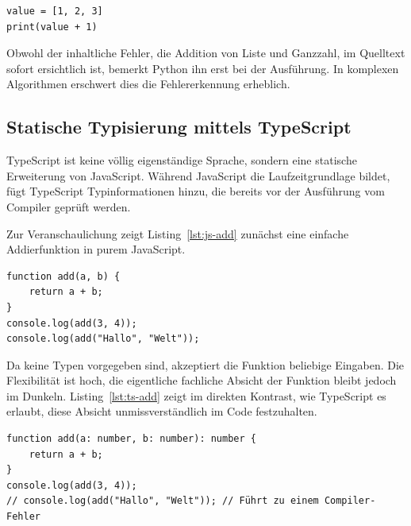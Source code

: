 \begin{listing}[htbp]
    \caption{Typfehler wird erst zur Laufzeit sichtbar}
    \label{lst:python-runtime-type-error}
    \begin{verbatim}
value = [1, 2, 3]
print(value + 1)
    \end{verbatim}
\end{listing}

Obwohl der inhaltliche Fehler, die Addition von Liste und Ganzzahl, im Quelltext sofort ersichtlich ist, bemerkt Python ihn erst bei der Ausführung. In komplexen Algorithmen erschwert dies die Fehlererkennung erheblich.

\subsection{Statische Typisierung mittels TypeScript}
\label{subsec:ts-als-erweiterung}

TypeScript ist keine völlig eigenständige Sprache, sondern eine statische Erweiterung von JavaScript. Während JavaScript die Laufzeitgrundlage bildet, fügt TypeScript Typinformationen hinzu, die bereits vor der Ausführung vom Compiler geprüft werden. 

Zur Veranschaulichung zeigt Listing~\ref{lst:js-add} zunächst eine einfache Addierfunktion in purem JavaScript.

\begin{listing}[htbp]
    \caption{Eine untypisierte Funktion in JavaScript}
    \label{lst:js-add}
    \begin{verbatim}
function add(a, b) {
    return a + b;
}
console.log(add(3, 4));
console.log(add("Hallo", "Welt"));
    \end{verbatim}
\end{listing}

Da keine Typen vorgegeben sind, akzeptiert die Funktion beliebige Eingaben. Die Flexibilität ist hoch, die eigentliche fachliche Absicht der Funktion bleibt jedoch im Dunkeln. Listing~\ref{lst:ts-add} zeigt im direkten Kontrast, wie TypeScript es erlaubt, diese Absicht unmissverständlich im Code festzuhalten.

\begin{listing}[htbp]
    \caption{Dieselbe Funktion in TypeScript mit expliziten Typen}
    \label{lst:ts-add}
    \begin{verbatim}
function add(a: number, b: number): number {
    return a + b;
}
console.log(add(3, 4));
// console.log(add("Hallo", "Welt")); // Führt zu einem Compiler-Fehler
    \end{verbatim}
\end{listing}

